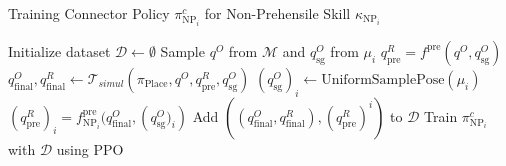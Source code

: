 \begin{algorithm}[H]
\caption{Training Connector Policy $\pi^c_{\text{NP}_i}$ for Non-Prehensile Skill $\kappa_{\text{NP}_i}$}\label{algo:train_connector_NP}
\begin{algorithmic}[1]
\State Initialize dataset $\mathcal{D} \leftarrow \emptyset$
    \State Sample $q^O$ from $\mathcal{M}$ and $q^O_{\text{sg}}$ from $\mu_i$
        \State $q^R_{\text{pre}} = f^{\text{pre}}(q^O, q^O_{\text{sg}})$
        \State $q^O_{\text{final}}, q^R_{\text{final}} \leftarrow \mathcal{T}_{simul}(\pi_{\text{Place}}, q^O, q^R_{\text{pre}}, q^O_{\text{sg}})$
            \State $(q^O_{\text{sg}})_i \leftarrow \text{UniformSamplePose}(\mu_i)$
                \State $(q^R_{\text{pre}})_i = f^{\text{pre}}_{\text{NP}_i}(q^O_{\text{final}}, ({q^O_{\text{sg}})_i})$
                \State Add $((q^O_{\text{final}}, q^R_{\text{final}}), (q^R_{\text{pre}})^i)$ to $\mathcal{D}$
            \EndIf
        \EndIf
    \EndIf
\EndWhile
\State Train $\pi^c_{\text{NP}_i}$ with $\mathcal{D}$ using PPO
\end{algorithmic}
\end{algorithm}
